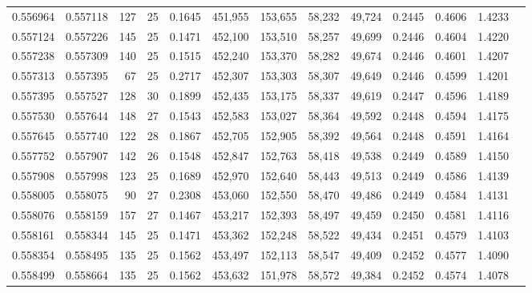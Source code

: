 \begin{tabular}{rrrrrrrrrrrrr}
0.556964 & 0.557118 & 127 &  25 &                                     0.1645 & 451,955 & 153,655 &  58,232 &  49,724 & 0.2445 & 0.4606 & 1.4233 \\
0.557124 & 0.557226 & 145 &  25 &                                     0.1471 & 452,100 & 153,510 &  58,257 &  49,699 & 0.2446 & 0.4604 & 1.4220 \\
0.557238 & 0.557309 & 140 &  25 &                                     0.1515 & 452,240 & 153,370 &  58,282 &  49,674 & 0.2446 & 0.4601 & 1.4207 \\
0.557313 & 0.557395 &  67 &  25 &                                     0.2717 & 452,307 & 153,303 &  58,307 &  49,649 & 0.2446 & 0.4599 & 1.4201 \\
0.557395 & 0.557527 & 128 &  30 &                                     0.1899 & 452,435 & 153,175 &  58,337 &  49,619 & 0.2447 & 0.4596 & 1.4189 \\
0.557530 & 0.557644 & 148 &  27 &                                     0.1543 & 452,583 & 153,027 &  58,364 &  49,592 & 0.2448 & 0.4594 & 1.4175 \\
0.557645 & 0.557740 & 122 &  28 &                                     0.1867 & 452,705 & 152,905 &  58,392 &  49,564 & 0.2448 & 0.4591 & 1.4164 \\
0.557752 & 0.557907 & 142 &  26 &                                     0.1548 & 452,847 & 152,763 &  58,418 &  49,538 & 0.2449 & 0.4589 & 1.4150 \\
0.557908 & 0.557998 & 123 &  25 &                                     0.1689 & 452,970 & 152,640 &  58,443 &  49,513 & 0.2449 & 0.4586 & 1.4139 \\
0.558005 & 0.558075 &  90 &  27 &                                     0.2308 & 453,060 & 152,550 &  58,470 &  49,486 & 0.2449 & 0.4584 & 1.4131 \\
0.558076 & 0.558159 & 157 &  27 &                                     0.1467 & 453,217 & 152,393 &  58,497 &  49,459 & 0.2450 & 0.4581 & 1.4116 \\
0.558161 & 0.558344 & 145 &  25 &                                     0.1471 & 453,362 & 152,248 &  58,522 &  49,434 & 0.2451 & 0.4579 & 1.4103 \\
0.558354 & 0.558495 & 135 &  25 &                                     0.1562 & 453,497 & 152,113 &  58,547 &  49,409 & 0.2452 & 0.4577 & 1.4090 \\
0.558499 & 0.558664 & 135 &  25 &                                     0.1562 & 453,632 & 151,978 &  58,572 &  49,384 & 0.2452 & 0.4574 & 1.4078 \\

\end{tabular}
